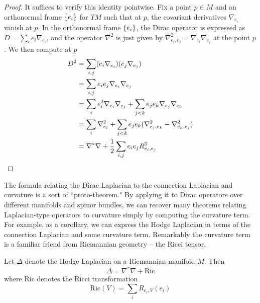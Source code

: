 \begin{proof}
It suffices to verify this identity pointwise. Fix a point $p \in M$ and an orthonormal
frame $\set{e_i}$ for $TM$ such that at $p$, the covariant derivatives
$\nabla_{e_i}$ vanish at $p$. In the orthonormal frame $\set{e_i}$, the Dirac operator is
expressed as $D = \sum_i e_i\nabla_{e_i}$, and the operator $\nabla^2$ is just given
by $\nabla^2_{e_i,e_j} = \nabla_{e_i}\nabla_{e_j}$ at the point $p$. We then compute at
$p$
\begin{align*}
D^2 &= \sum_{i,j}(e_i\nabla_{e_i})(e_j\nabla_{e_j}) \\
&= \sum_{i,j} e_ie_j\nabla_{e_i}\nabla_{e_j} \\
&= \sum_i e_i^2\nabla_{e_i}\nabla_{e_j} + \sum_{j < k} e_j e_k\nabla_{e_j}\nabla_{e_k} \\
&= \sum_i \nabla^2_{e_i}
+ \sum_{j < k} e_je_k (\nabla^2_{e_j, e_k} - \nabla^2_{e_k, e_j}) \\
&= \nabla^*\nabla + \frac{1}{2}\sum_{i, j} e_i e_j R^\S_{e_i, e_j}
\end{align*}
\end{proof}
%
The formula relating the Dirac Laplacian to the connection Laplacian and curvature
is a sort of ``proto-theorem." By applying it to Dirac operators over different
manifolds and spinor bundles, we can recover many theorems relating Laplacian-type
operators to curvature simply by computing the curvature term. For example,
as a corollary, we can express the Hodge Laplacian in terms of the connection Laplacian
and some curvature term. Remarkably the curvature term is a familiar friend from
Riemannian geometry -- the Ricci tensor.
%
\begin{cor}
Let $\Delta$ denote the Hodge Laplacian on a Riemannian manifold $M$. Then
\[
\Delta = \nabla^*\nabla + \mathrm{Ric}
\]
where $\mathrm{Ric}$ denotes the Ricci transformation
\[
\mathrm{Ric}(V) = \sum_{i} R_{e_i,V}(e_i)
\]
\end{cor}
%
